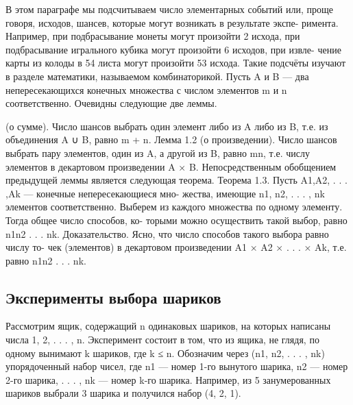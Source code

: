 В этом параграфе мы подсчитываем число элементарных событий или,
проще говоря, исходов, шансев, которые могут возникать в результате экспе-
римента. Например, при подбрасывание монеты могут произойти 2 исхода,
при подбрасывание игрального кубика могут произойти 6 исходов, при извле-
чение карты из колоды в 54 листа могут произойти 53 исхода. Такие подсчёты
изучают в разделе математики, называемом комбинаторикой.
Пусть A и B — два непересекающихся конечных множества с числом
элементов m и n соответственно. Очевидны следующие две леммы.


 (о сумме). Число шансов выбрать один элемент либо из A
либо из B, т.е. из объединения A ∪ B, равно m + n.
Лемма 1.2 (о произведении). Число шансов выбрать пару элементов,
один из A, а другой из B, равно mn, т.е. числу элементов в декартовом
произведении A × B.
Непосредственным обобщением предыдущей леммы является следующая
теорема.
Теорема 1.3. Пусть A1,A2, . . . ,Ak — конечные непересекающиеся мно-
жества, имеющие n1, n2, . . . , nk элементов соответственно. Выберем из
каждого множества по одному элементу. Тогда общее число способов, ко-
торыми можно осуществить такой выбор, равно n1n2 . . . nk.
Доказательство. Ясно, что число способов такого выбора равно числу то-
чек (элементов) в декартовом произведении A1 × A2 × . . . × Ak, т.е. равно
n1n2 . . . nk.

\subsection{Эксперименты выбора шариков}
Рассмотрим ящик, содержащий n одинаковых шариков, на которых написаны
числа 1, 2, . . . , n. Эксперимент состоит в том, что из ящика, не глядя, по
одному вынимают k шариков, где k ≤ n. Обозначим через
(n1, n2, . . . , nk)
упорядоченный набор чисел, где n1 — номер 1-го вынутого шарика, n2 —
номер 2-го шарика, . . . , nk — номер k-го шарика.
Например, из 5 занумерованных шариков выбрали 3 шарика и получился
набор (4, 2, 1).

